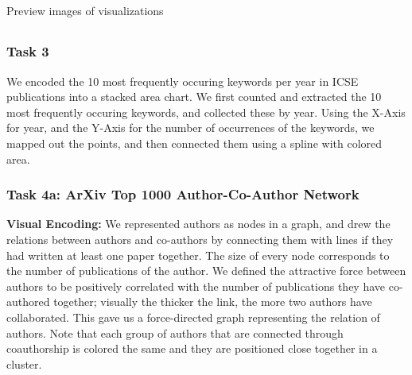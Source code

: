 \documentclass{article}
\begin{document}
\subsection{}

Preview images of visualizations







\subsection{}

\subsubsection*{Task 3}

We encoded the 10 most frequently occuring keywords per year in ICSE publications into a stacked area chart. We first counted and extracted the 10 most frequently occuring keywords, and collected these by year. Using the X-Axis for year, and the Y-Axis for the number of occurrences of the keywords, we mapped out the points, and then connected them using a spline with colored area.

\subsubsection*{Task 4a: ArXiv Top 1000 Author-Co-Author Network}

\textbf{Visual Encoding:} We represented authors as nodes in a graph, and drew the relations between authors and co-authors by connecting them with lines if they had written at least one paper together. The size of every node corresponds to the number of publications of the author. We defined the attractive force between authors to be positively correlated with the number of publications they have co-authored together; visually the thicker the link, the more two authors have collaborated. This gave us a force-directed graph representing the relation of authors. Note that each group of authors that are connected through coauthorship is colored the same and they are positioned close together in a cluster. 
\end{document}
